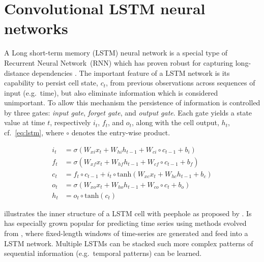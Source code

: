 \documentclass[preprint,11pt,5p,twocolumn]{elsarticle}
\begin{document}
\section{Convolutional LSTM neural networks}
\label{sec:convlstm}
A Long short-term memory (LSTM) neural network is a special type of Recurrent Neural Network~(RNN) which has proven robust for capturing long-distance dependencies \cite{Lstm1,Lstm2}. The important feature of a LSTM network is its capability to persist cell state, $c_t$, from previous observations across sequences of input (e.g.\ time), but also eliminate information which is considered unimportant. To allow this mechanism the persistence of information is controlled by three gates: \emph{input gate}, \emph{forget gate}, and \emph{output gate}. Each gate yields a state value at time $t$, respectively $i_t$, $f_t$, and $o_t$, along with the cell output, $h_t$, cf.~\cref{eq:lstm}, where $\circ$ denotes the entry-wise product.

\begin{equation}
\begin{aligned}
  i_t &= \sigma \left( W_\mathit{xi} x_t + W_\mathit{hi} h_{t-1} + W_{ci} \circ c_{t-1} + b_i \right) \\
  f_t &= \sigma \left( W_\mathit{xf} x_t + W_\mathit{hf} h_{t-1} + W_\mathit{cf} \circ c_{t-1} + b_f \right) \\
  c_t &= f_t \circ c_{t-1} + i_t \circ \mathrm{tanh} \left( W_\mathit{xc} x_t + W_\mathit{hc} h_{t-1} + b_c \right) \\
  o_t &= \sigma \left( W_\mathit{xo} x_t + W_\mathit{ho} h_{t-1} + W_\mathit{co} \circ c_{t} + b_o \right) \\
  h_t &= o_t \circ \mathrm{tanh} \left( c_t \right)
\end{aligned}
\label{eq:lstm}
\end{equation}
\vspace{.5em}

 illustrates the inner structure of a LSTM cell with peephole as proposed by \cite{LstmPeephole}. 
Is has especially grown popular for predicting time series using methods evolved from \cite{LstmTs}, where fixed-length windows of time-series are generated and feed into a LSTM network. Multiple LSTMs can be stacked such more complex patterns of sequential information (e.g.\ temporal patterns) can be learned.
\end{document}
